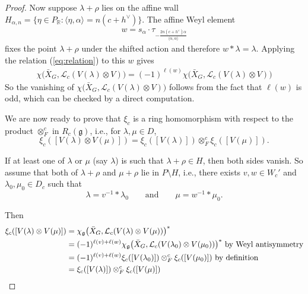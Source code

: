\documentclass[12pt]{article}
\begin{document}
\begin{proof}
Now suppose $\lambda+\rho$ lies on the affine wall
$H_{\alpha,n}=\{\eta\in P_{\mathbb R}:\langle \eta,\alpha\rangle=n(c+h^\vee)\}$. The affine Weyl element \begin{align*}
    w = s_\alpha\cdot \tau_{-\frac{2n(c+h^\vee)\alpha}{\langle \alpha,\alpha\rangle}}
\end{align*} fixes the point $\lambda+\rho$ under the shifted action and therefore $w * \lambda = \lambda$. Applying the relation (\ref{eq:relation}) to this $w$ gives
\begin{align*}
    \chi\bigl(\bar X_G,\mathcal L_c(V(\lambda)\otimes V)\bigr)
=
(-1)^{\ell(w)}
\chi\bigl(\bar X_G,\mathcal L_c(V(\lambda)\otimes V)\bigr)
\end{align*} So the vanishing of $\chi\bigl(\bar X_G,\mathcal L_c(V(\lambda)\otimes V)\bigr)$ follows from the fact that $\ell(w)$ is odd, which can be checked by a direct computation.


We are now ready to prove that \(\xi_c\) is a ring homomorphism with respect to the product \(\otimes_F^c\) in \(R_c(\mathfrak g)\), i.e., for \(\lambda,\mu\in D\),
\begin{equation}
\xi_c([V(\lambda)\otimes V(\mu)])
=
\xi_c([V(\lambda)])\otimes_F^c \xi_c([V(\mu)]).
\end{equation}

If at least one of \(\lambda\) or \(\mu\) (say \(\lambda\)) is such that \(\lambda+\rho\in H\), then both sides vanish.
So assume that both of \(\lambda+\rho\) and \(\mu+\rho\) lie in \(P\setminus H\), i.e., there exists \(v,w\in W_c'\) and \(\lambda_0,\mu_0\in D_c\) such that
\[
\lambda=v^{-1}*\lambda_0
\qquad\text{and}\qquad
\mu=w^{-1}*\mu_0.
\]

Then
\begin{align*}
\xi_c([V(\lambda)\otimes V(\mu)])
&=
\chi_{\mathfrak g}\bigl(\bar X_G,\mathcal L_c(V(\lambda)\otimes V(\mu))\bigr)^* \\
&=
(-1)^{\ell(v)+\ell(w)}
\chi_{\mathfrak g}\bigl(\bar X_G,\mathcal L_c(V(\lambda_0)\otimes V(\mu_0))\bigr)^* \text{ by Weyl antisymmetry}\\
&=
(-1)^{\ell(v)+\ell(w)}
\xi_c([V(\lambda_0)])\otimes_F^c \xi_c([V(\mu_0)]) \text{ by definition}
\\
&=
\xi_c([V(\lambda)])\otimes_F^c \xi_c([V(\mu)]) \qedhere
\end{align*}
\end{proof}
\end{document}
